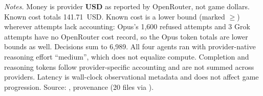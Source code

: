 \begin{landscape}
{\footnotesize\textit{Notes.} Money is provider \textbf{USD} as reported by OpenRouter, not game dollars. Known cost totals 141.71~USD. Known cost is a lower bound (marked $\geq$) wherever attempts lack accounting: Opus's 1,600 refused attempts and 3 Grok attempts have no OpenRouter cost record, so the Opus token totals are lower bounds as well. Decisions sum to 6,989. All four agents ran with provider-native reasoning effort ``medium'', which does not equalize compute. Completion and reasoning tokens follow provider-specific accounting and are not summed across providers. Latency is wall-clock observational metadata and does not affect game progression. Source: , provenance  (20  files via ).\par}

\end{landscape}
\endgroup
